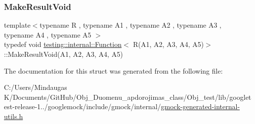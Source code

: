\subsubsection{\texorpdfstring{MakeResultVoid}{MakeResultVoid}}
{\footnotesize\ttfamily template$<$typename R , typename A1 , typename A2 , typename A3 , typename A4 , typename A5 $>$ \\
typedef void \mbox{\hyperlink{structtesting_1_1internal_1_1_function}{testing\+::internal\+::\+Function}}$<$ R(A1, A2, A3, A4, A5)$>$\+::Make\+Result\+Void(A1, A2, A3, A4, A5)}



The documentation for this struct was generated from the following file\+:\begin{DoxyCompactItemize}
\item 
C\+:/\+Users/\+Mindaugas K/\+Documents/\+Git\+Hub/\+Obj\+\_\+\+Duomenu\+\_\+apdorojimas\+\_\+class/\+Obj\+\_\+test/lib/googletest-\/release-\/1../googlemock/include/gmock/internal/\mbox{\hyperlink{gmock-generated-internal-utils_8h}{gmock-\/generated-\/internal-\/utils.\+h}}\end{DoxyCompactItemize}
